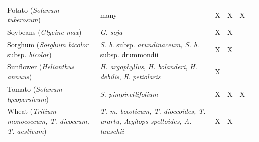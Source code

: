 \documentclass[11pt]{article}
\begin{document}
\begin{table}
\begin{tabular}{G{4.5cm}G{5.5cm}C{1.75cm}C{2.5cm}C{2.25cm}G{3.5cm}}
Potato (\emph{Solanum tuberosum}) & many & X & X & X & \cite{hardigan2017genome}\\
Soybeans (\emph{Glycine max}) & \emph{G. soja} & X & X &  & \cite{han2016domestication} \\ 
 
Sorghum (\emph{Sorghum bicolor} subsp. \emph{bicolor}) & \emph{S. b.} subsp. \emph{arundinaceum, S. b.} subsp. {drummondii} & X & X &  & \cite{aldrich1992patterns} \\

Sunflower (\emph{Helianthus annuus}) & \emph{H. argophyllus}, \emph{H. bolanderi}, \emph{H. debilis}, \emph{H. petiolaris} & X &   &   & \cite{rieseberg2007hybridization}\\
Tomato (\emph{Solanum lycopersicum}) & \emph{S. pimpinellifolium} & X & X & X & \cite{rick1958role} \\

 Wheat (\emph{Tritium monococcum, T. dicoccum, T. aestivum}) & \emph{T. m. boeoticum, T. dioccoides, T. urartu, Aegilops speltoides, A. tauschii} & X & X &  & \cite{dvorak2006molecular} \\

    \end{tabular}
\end{table}
\end{document}
